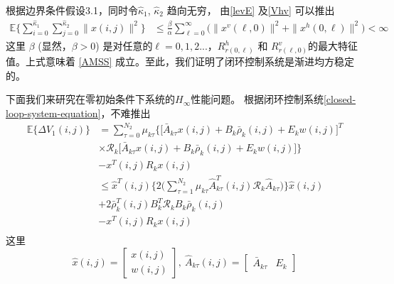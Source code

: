 	根据边界条件假设3.1，同时令$\hat{\kappa}_{1}$, $\hat{\kappa}_{2}$ 趋向无穷， 由\eqref{levE} 及\eqref{Vhv} 可以推出
	\begin{equation}
	\begin{split}
	\mathbb{E}\Big\{\sum_{i=0}^{\hat{\kappa}_{1}}\sum_{j=0}^{\hat{\kappa}_{2}}  \|x(i,j)\|^{2} \Big\} &\leq \frac{\beta}{\alpha} \sum_{\ell=0}^{\infty} \big(  \|x^{v}(\ell,0)\|^{2} + \|x^{h}(0,\ell)\|^{2} \big)<\infty
	\end{split}	
	\end{equation}
	这里 $\beta$ (显然，$\beta>0$) 是对任意的$\ell=0,1,2...$，$R^{h}_{r(0,\ell)}$ 和 $R^{v}_{r(\ell,0)}$的最大特征值。上式意味着 \eqref{AMSS} 成立。至此，我们证明了闭环控制系统是渐进均方稳定的。
	
	下面我们来研究在零初始条件下系统的$H_{\infty}$性能问题。 根据闭环控制系统\eqref{closed-loop-system-equation}，不难推出
	\begin{equation}\label{DETAV1}
	\begin{split}
	\mathbb{E}\{\varDelta V_{1}(i,j) \} &=  \sum_{\tau =0}^{N_{2}}\mu_{k\tau }\Big\{\big[\bar{A}_{k\tau }x(i,j)+B_{k}\bar{\rho}_{k}(i,j)+E_{k}w(i,j)\big]^{T}\\
	&\times \mathcal{R}_{k}\big[\bar{A}_{k\tau }x(i,j)+B_{k}\bar{\rho}_{k}(i,j)+E_{k}w(i,j)\big]\Big\}\\
	&- x^{T}(i,j)R_{k}x(i,j) \\
	&\leq \hat{x}^{T}(i,j) \Big\{2\big(\sum_{\tau =1}^{N_{2}}\mu_{k\tau }\hat{A}^{T}_{k\tau }(i,j)\mathcal{R}_{k}\hat{A}_{k\tau }\big)\Big\}\hat{x}(i,j)\\ &+2\bar{\rho}^{T}_{k}(i,j)B^{T}_{k}\mathcal{R}_{k}B_{k}\bar{\rho}_{k}(i,j) \\
	&-  x^{T}(i,j)R_{k}x(i,j)\\
	\end{split}
	\end{equation}
	这里
	\begin{equation*}
	\hat{x}(i,j)=\begin{bmatrix}
	x(i,j)\\ w(i,j)
	\end{bmatrix},\ \hat{A}_{k\tau }(i,j)=\begin{bmatrix}
	\bar{A}_{k\tau }&E_{k}
	\end{bmatrix}
	\end{equation*}
